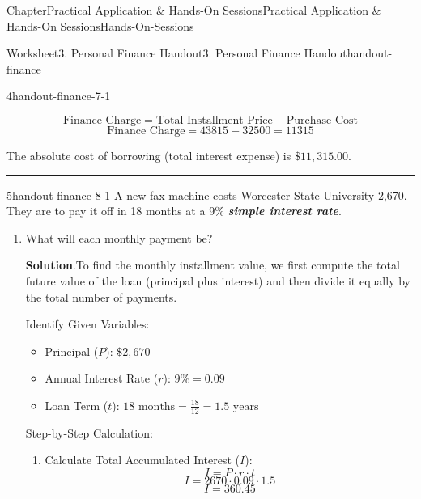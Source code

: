 \documentclass[oneside,10pt,]{book}
\newcommand{\blocktitlefont}{\relax}
\newcommand{\ptxlistdisc}{\raisebox{0.3ex}{\textbullet}}
\newcommand{\alert}[1]{\textbf{\textit{#1}}}
\newlength{\workspacestrutwidth}
\begin{document}
\begin{chapterptx}{Chapter}{Practical Application \& Hands-On Sessions}{}{Practical Application \& Hands-On Sessions}{}{}{Hands-On-Sessions}
\begin{worksheet-section}{Worksheet}{3. Personal Finance Handout}{}{3. Personal Finance Handout}{}{}{handout-finance}
\begin{divisionexercise}{4}{}{}{handout-finance-7-1}
\begin{enumerate}[font=\bfseries,label=(\alph*),ref=\alph*]
\par
%
\begin{equation*}
\text{Finance Charge} = \text{Total Installment Price} - \text{Purchase Cost}
\end{equation*}
%
\begin{equation*}
\text{Finance Charge} = 43815 - 32500 = 11315
\end{equation*}
%
\par
The absolute cost of borrowing (total interest expense) is \(\$11,315.00\).%
\par\rule{\workspacestrutwidth}{1in}%
\end{enumerate}%
\end{divisionexercise}%
\clearpage
\begin{divisionexercise}{5}{}{}{handout-finance-8-1}%
A new fax machine costs Worcester State University \textdollar{}2,670. They are to pay it off in 18 months at a 9\% \alert{simple interest rate}.%
\begin{enumerate}[font=\bfseries,label=(\alph*),ref=\alph*]%
\item{}What will each monthly payment be?%
\par\smallskip%
\noindent\textbf{\blocktitlefont Solution}.\hypertarget{handout-finance-8-1-2-2}{}\quad{}To find the monthly installment value, we first compute the total future value of the loan (principal plus interest) and then divide it equally by the total number of payments.%
\par
Identify Given Variables:%
\begin{itemize}[label=\ptxlistdisc]
\item{}Principal (\(P\)): \(\$2,670\)%
\item{}Annual Interest Rate (\(r\)): \(9\% = 0.09\)%
\item{}Loan Term (\(t\)): \(18 \text{ months} = \frac{18}{12} = 1.5 \text{ years}\)%
\end{itemize}
%
\par
Step-by-Step Calculation:%
\begin{enumerate}[label={(\alph*)}]
\item{}Calculate Total Accumulated Interest (\(I\)):%
\begin{equation*}
I = P \cdot r \cdot t
\end{equation*}
%
\begin{equation*}
I = 2670 \cdot 0.09 \cdot 1.5
\end{equation*}
%
\begin{equation*}
I = 360.45
\end{equation*}

\end{enumerate}
\end{enumerate}
\end{divisionexercise}
\end{worksheet-section}
\end{chapterptx}
\end{document}
